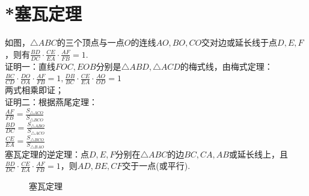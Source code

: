 \section{*塞瓦定理}
\begin{definition}
    如图，$\triangle ABC$的三个顶点与一点$O$的连线$AO,BO,CO$交对边或延长线于点$D,E,F$，则有$\frac{BD}{DC}·\frac{CE}{EA}·\frac{AF}{FB}=1$. \\
    证明一：直线$FOC,EOB$分别是$\triangle ABD,\triangle ACD$的梅式线，由梅式定理： \\
    $\frac{BC}{CD}·\frac{DO}{OA}·\frac{AF}{FB}=1,\frac{DB}{BC}·\frac{CE}{EA}·\frac{AO}{OD}=1$ \\
    两式相乘即证；\\
    证明二：根据燕尾定理：\\
    $\frac{AF}{FB}=\frac{S_{\triangle ACO}}{S_{\triangle BCO}}$ \\
    $\frac{BD}{DC}=\frac{S_{\triangle ABO}}{S_{\triangle ACO}}$ \\
    $\frac{CE}{EA}=\frac{S_{\triangle BCO}}{S_{\triangle BAO}}$ \\
    塞瓦定理的逆定理：点$D,E,F$分别在$\triangle ABC$的边$BC,CA,AB$或延长线上，且$\frac{BD}{DC}·\frac{CE}{EA}·\frac{AF}{FB}=1$，则$AD,BE,CF$交于一点(或平行). \\
\end{definition}
\begin{figure}[H]
    \centering
    \resizebox{4cm}{!}{}
    \caption{塞瓦定理}
\end{figure}
\clearpage
